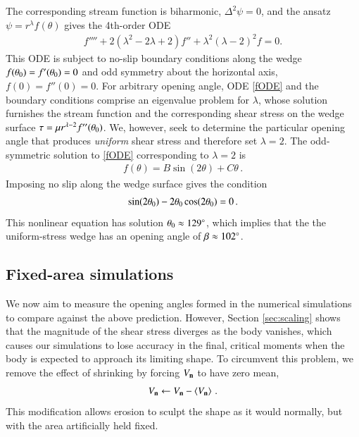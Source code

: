 \documentclass[preprint, 10pt]{elsarticle}
\begin{document}
The corresponding stream function is biharmonic, $\Delta^2 \psi = 0$, and the ansatz $\psi = r^{\lambda}f(\theta)$ gives the 4th-order ODE~\cite{poz1997}
\begin{align}
\label{fODE}
f'''' + 2(\lambda^2 - 2 \lambda + 2)f'' + \lambda^2(\lambda-2)^2 f = 0.
\end{align}
This ODE is subject to no-slip boundary conditions along the wedge $f(\theta_0) = f'(\theta_0) = 0$ and odd symmetry about the horizontal axis, $f(0) = f''(0) = 0$. For arbitrary opening angle, ODE \eqref{fODE} and the boundary conditions comprise an eigenvalue problem for $\lambda$, whose solution furnishes the stream function and the corresponding shear stress on the wedge surface $\tau = \mu r^{\lambda-2} f''(\theta_0)$. We, however, seek to determine the particular opening angle that produces {\em uniform} shear stress and therefore set $\lambda = 2$.
The odd-symmetric solution to \eqref{fODE} corresponding to $\lambda=2$ is
\begin{align}
  f(\theta) = B \sin (2 \theta) + C \theta \, .
\end{align}
Imposing no slip along the wedge surface gives the condition
\begin{align}
  \sin(2 \theta_0) - 2 \theta_0 \cos(2 \theta_0) = 0 \, .
\end{align}
This nonlinear equation has solution $\theta_0 \approx 129^\circ$, which implies that the the uniform-stress wedge has an opening angle of $\beta \approx 102^\circ$.


\subsection{Fixed-area simulations}

We now aim to measure the opening angles formed in the numerical simulations to compare against the above prediction. However, Section \ref{sec:scaling} shows that the magnitude of the shear stress diverges as the body vanishes, which causes our simulations to lose accuracy in the final, critical moments when the body is expected to approach its limiting shape. To circumvent this problem, we remove the effect of shrinking by forcing $V_{\mathbf{n}}$ to have zero mean,
\begin{align}
V_{\mathbf{n}} \leftarrow V_{\mathbf{n}} - \left< V_{\mathbf{n}} \right> \, .
\end{align}
This modification allows erosion to sculpt the shape as it would normally, but with the area artificially held fixed.
\end{document}
